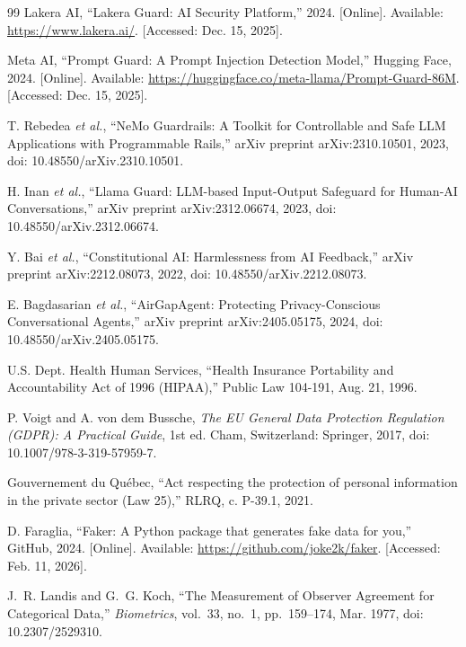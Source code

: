 \documentclass{ieeeaccess}
\begin{document}
\begin{thebibliography}{99}
Lakera AI, ``Lakera Guard: AI Security Platform,'' 2024. [Online]. Available: \url{https://www.lakera.ai/}. [Accessed: Dec. 15, 2025].

Meta AI, ``Prompt Guard: A Prompt Injection Detection Model,'' Hugging Face, 2024. [Online]. Available: \url{https://huggingface.co/meta-llama/Prompt-Guard-86M}. [Accessed: Dec. 15, 2025].

T. Rebedea \emph{et al.}, ``NeMo Guardrails: A Toolkit for Controllable and Safe LLM Applications with Programmable Rails,'' arXiv preprint arXiv:2310.10501, 2023, doi: 10.48550/arXiv.2310.10501.

H. Inan \emph{et al.}, ``Llama Guard: LLM-based Input-Output Safeguard for Human-AI Conversations,'' arXiv preprint arXiv:2312.06674, 2023, doi: 10.48550/arXiv.2312.06674.

Y. Bai \emph{et al.}, ``Constitutional AI: Harmlessness from AI Feedback,'' arXiv preprint arXiv:2212.08073, 2022, doi: 10.48550/arXiv.2212.08073.

E. Bagdasarian \emph{et al.}, ``AirGapAgent: Protecting Privacy-Conscious Conversational Agents,'' arXiv preprint arXiv:2405.05175, 2024, doi: 10.48550/arXiv.2405.05175.

U.S. Dept. Health Human Services, ``Health Insurance Portability and Accountability Act of 1996 (HIPAA),'' Public Law 104-191, Aug. 21, 1996.

P. Voigt and A. von dem Bussche, \emph{The EU General Data Protection Regulation (GDPR): A Practical Guide}, 1st ed. Cham, Switzerland: Springer, 2017, doi: 10.1007/978-3-319-57959-7.

Gouvernement du Qu\'{e}bec, ``Act respecting the protection of personal information in the private sector (Law 25),'' RLRQ, c. P-39.1, 2021.

D. Faraglia, ``Faker: A Python package that generates fake data for you,'' GitHub, 2024. [Online]. Available: \url{https://github.com/joke2k/faker}. [Accessed: Feb. 11, 2026].

J.~R. Landis and G.~G. Koch, ``The Measurement of Observer Agreement for Categorical Data,'' \emph{Biometrics}, vol.~33, no.~1, pp.~159--174, Mar. 1977, doi: 10.2307/2529310.


\end{thebibliography}
\end{document}
